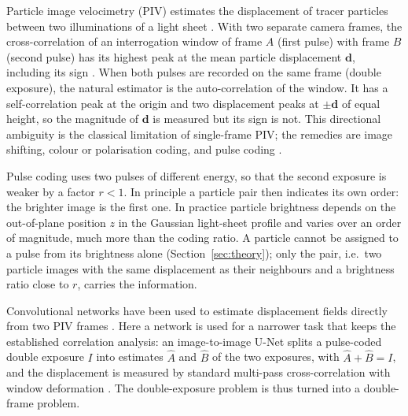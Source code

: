 \documentclass[11pt]{article}
\theoremstyle{remark}
\newcommand{\dd}{\mathbf{d}}
\begin{document}
Particle image velocimetry (PIV) estimates the displacement of tracer particles between two illuminations of a light sheet \citep{adrian1991,adrian2011,raffel2018}.
With two separate camera frames, the cross-correlation of an interrogation window of frame $A$ (first pulse) with frame $B$ (second pulse) has its highest peak at the mean particle displacement $\dd$, including its sign \citep{keane1992,willert1991}.
When both pulses are recorded on the same frame (double exposure), the natural estimator is the auto-correlation of the window.
It has a self-correlation peak at the origin and two displacement peaks at $\pm\dd$ of equal height, so the magnitude of $\dd$ is measured but its sign is not.
This directional ambiguity is the classical limitation of single-frame PIV; the remedies are image shifting, colour or polarisation coding, and pulse coding \citep{adrian1991,raffel2018}.

Pulse coding uses two pulses of different energy, so that the second exposure is weaker by a factor $r<1$.
In principle a particle pair then indicates its own order: the brighter image is the first one.
In practice particle brightness depends on the out-of-plane position $z$ in the Gaussian light-sheet profile and varies over an order of magnitude, much more than the coding ratio.
A particle cannot be assigned to a pulse from its brightness alone (Section~\ref{sec:theory}); only the pair, i.e.\ two particle images with the same displacement as their neighbours and a brightness ratio close to $r$, carries the information.

Convolutional networks have been used to estimate displacement fields directly from two PIV frames \citep{rabault2017,cai2019,lagemann2021}.
Here a network is used for a narrower task that keeps the established correlation analysis: an image-to-image U-Net \citep{ronneberger2015} splits a pulse-coded double exposure $I$ into estimates $\hat A$ and $\hat B$ of the two exposures, with $\hat A+\hat B=I$, and the displacement is measured by standard multi-pass cross-correlation with window deformation \citep{scarano2002}.
The double-exposure problem is thus turned into a double-frame problem.
\end{document}
